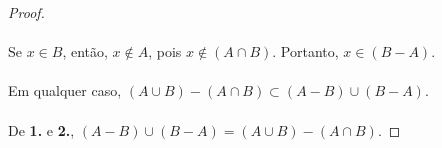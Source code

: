 \documentclass[9pt,twocolumn,a4paper]{article}
\begin{document}
\begin{proof}
    \paragraph{}
    Se $x \in B$, então, $x \not\in A$, pois $x \not\in (A \cap B)$. Portanto, $x \in (B - A)$.

    \paragraph{}
    Em qualquer caso, $(A \cup B) - (A \cap B) \subset (A - B) \cup (B - A)$. 
    
    \paragraph{}
    De \textbf{1.} e \textbf{2.}, $(A - B) \cup (B - A) = (A \cup B) - (A \cap B)$.
    \end{proof}
\end{document}
